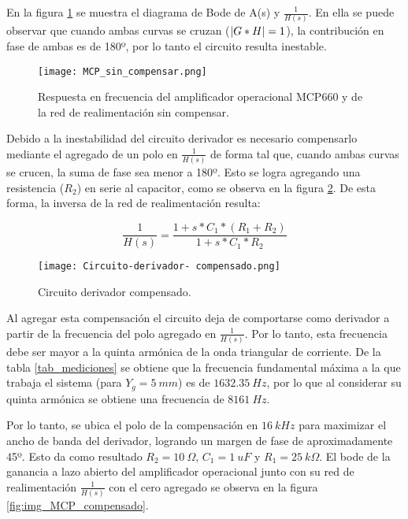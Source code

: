 En la figura \ref{fig:img_MCP_sin_compensar} se muestra el diagrama de Bode de A(s) y $\frac{1}{H(s)}$. En ella se puede observar que cuando ambas curvas se cruzan ($\lvert G*H\rvert=1$), la contribución en fase de ambas es de 180º, por lo tanto el circuito resulta inestable. 

\begin{figure}[H]
	\centering
	\texttt{[image: MCP\_sin\_compensar.png]}
	\caption{Respuesta en frecuencia del amplificador operacional MCP660 y de la red de realimentación sin compensar.}
	\label{fig:img_MCP_sin_compensar}
\end{figure}

Debido a la inestabilidad del circuito derivador es necesario compensarlo mediante el agregado de un polo en $\frac{1}{H(s)}$ de forma tal que, cuando ambas curvas se crucen, la suma de fase sea menor a 180º. Esto se logra agregando una resistencia ($R_2$) en serie al capacitor, como se observa en la figura \ref{fig:img_Circuito_derivador_compensado}. De esta forma, la inversa de la red de realimentación resulta:

\begin{equation} \label{eq_MCP_compensado}
	\frac{1}{H(s)}=\frac{1+s*C_1*(R_1+R_2)}{1+s*C_1*R_2}
\end{equation}

\begin{figure}[H]
	\centering
	\texttt{[image: Circuito-derivador- compensado.png]}
	\caption{Circuito derivador compensado.}
	\label{fig:img_Circuito_derivador_compensado}
\end{figure}

Al agregar esta compensación el circuito deja de comportarse como derivador a partir de la frecuencia del polo agregado en $\frac{1}{H(s)}$. Por lo tanto, esta frecuencia debe ser mayor a la quinta armónica de la onda triangular de corriente. De la tabla \ref{tab_mediciones} se obtiene que la frecuencia fundamental máxima a la que trabaja el sistema (para $Y_g=5\:mm$) es de $1632.35\:Hz$, por lo que al considerar su quinta armónica se obtiene una frecuencia de $8161\:Hz$. 

Por lo tanto, se ubica el polo de la compensación en $16\:kHz$ para maximizar el ancho de banda del derivador, logrando un margen de fase de aproximadamente 45º. Esto da como resultado $R_2=10\:\Omega$, $C_1=1\:uF$ y $R_1=25\: k\Omega$. El bode de la ganancia a lazo abierto del amplificador operacional junto con su red de realimentación $\frac{1}{H(s)}$ con el cero agregado se observa en la figura \ref{fig:img_MCP_compensado}.

